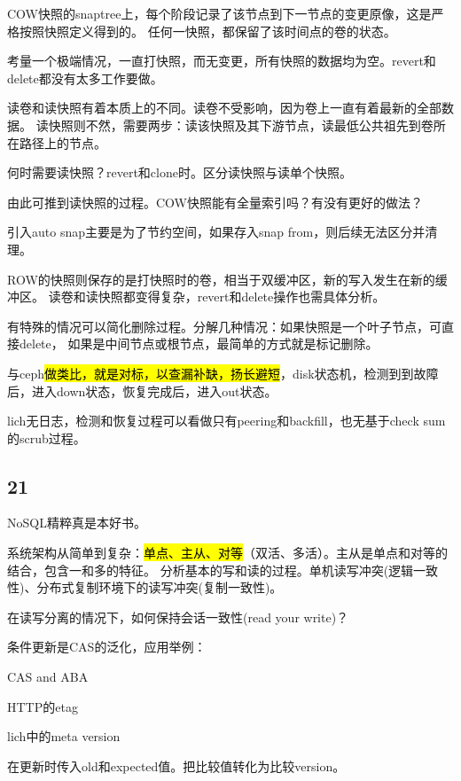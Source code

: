 COW快照的snaptree上，每个阶段记录了该节点到下一节点的变更原像，这是严格按照快照定义得到的。
任何一快照，都保留了该时间点的卷的状态。

考量一个极端情况，一直打快照，而无变更，所有快照的数据均为空。revert和delete都没有太多工作要做。

读卷和读快照有着本质上的不同。读卷不受影响，因为卷上一直有着最新的全部数据。
读快照则不然，需要两步：读该快照及其下游节点，读最低公共祖先到卷所在路径上的节点。

何时需要读快照？revert和clone时。区分读快照与读单个快照。

由此可推到读快照的过程。COW快照能有全量索引吗？有没有更好的做法？

引入auto snap主要是为了节约空间，如果存入snap from，则后续无法区分并清理。

\hrulefill

ROW的快照则保存的是打快照时的卷，相当于双缓冲区，新的写入发生在新的缓冲区。
读卷和读快照都变得复杂，revert和delete操作也需具体分析。

有特殊的情况可以简化删除过程。分解几种情况：如果快照是一个叶子节点，可直接delete，
如果是中间节点或根节点，最简单的方式就是标记删除。

\hrulefill

与ceph\hl{做类比，就是对标，以查漏补缺，扬长避短}，disk状态机，检测到到故障后，进入down状态，恢复完成后，进入out状态。

lich无日志，检测和恢复过程可以看做只有peering和backfill，也无基于check sum的scrub过程。

\subsection{21}

NoSQL精粹真是本好书。

系统架构从简单到复杂：\hl{单点、主从、对等}（双活、多活）。主从是单点和对等的结合，包含一和多的特征。
分析基本的写和读的过程。单机读写冲突(逻辑一致性)、分布式复制环境下的读写冲突(复制一致性)。

在读写分离的情况下，如何保持会话一致性(read your write)？

条件更新是CAS的泛化，应用举例：
\begin{enumbox}
\item CAS and ABA
\item HTTP的etag
\item lich中的meta version
\end{enumbox}

在更新时传入old和expected值。把比较值转化为比较version。

